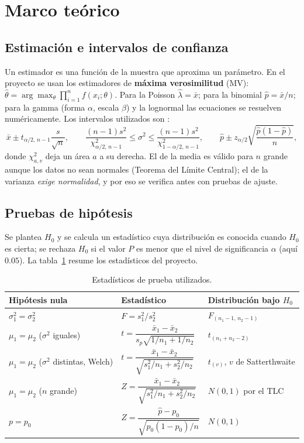 \documentclass[11pt]{article}
\begin{document}
\newpage
\section{Marco teórico}\label{sec:marco}
\subsection{Estimación e intervalos de confianza}
Un estimador es una función de la muestra que aproxima un parámetro. En el proyecto se usan los estimadores de
\textbf{máxima verosimilitud} (MV): $\hat\theta=\arg\max_\theta\prod_{i=1}^n f(x_i;\theta)$. Para la Poisson
$\hat\lambda=\bar x$; para la binomial $\hat p=\bar x/n$; para la gamma (forma $\alpha$, escala $\beta$) y la
lognormal las ecuaciones se resuelven numéricamente. Los intervalos utilizados son \cite{walpole,montgomery}:
\begin{equation}
\bar x\pm t_{\alpha/2,\,n-1}\frac{s}{\sqrt n},\qquad
\frac{(n-1)s^2}{\chi^2_{\alpha/2,\,n-1}}\le\sigma^2\le\frac{(n-1)s^2}{\chi^2_{1-\alpha/2,\,n-1}},\qquad
\hat p\pm z_{\alpha/2}\sqrt{\frac{\hat p(1-\hat p)}{n}},
\label{eq:ic}
\end{equation}
donde $\chi^2_{a,v}$ deja un área $a$ a su derecha. El de la media es válido para $n$ grande aunque los datos no
sean normales (Teorema del Límite Central); el de la varianza \emph{exige normalidad}, y por eso se verifica antes
con pruebas de ajuste.

\subsection{Pruebas de hipótesis}
Se plantea $H_0$ y se calcula un estadístico cuya distribución es conocida cuando $H_0$ es cierta; se rechaza
$H_0$ si el valor $P$ es menor que el nivel de significancia $\alpha$ (aquí $0.05$). La tabla~\ref{tab:pruebas}
resume los estadísticos del proyecto.
\begin{table}[H]\centering\small\caption{Estadísticos de prueba utilizados.}\label{tab:pruebas}
\begin{tabular}{lll}\toprule
\textbf{Hipótesis nula} & \textbf{Estadístico} & \textbf{Distribución bajo $H_0$}\\\midrule
$\sigma_1^2=\sigma_2^2$ & $F=s_1^2/s_2^2$ & $F_{(n_1-1,\,n_2-1)}$\\[2pt]
$\mu_1=\mu_2$ ($\sigma^2$ iguales) & $t=\dfrac{\bar x_1-\bar x_2}{s_p\sqrt{1/n_1+1/n_2}}$ & $t_{(n_1+n_2-2)}$\\[8pt]
$\mu_1=\mu_2$ ($\sigma^2$ distintas, Welch) & $t=\dfrac{\bar x_1-\bar x_2}{\sqrt{s_1^2/n_1+s_2^2/n_2}}$ &
$t_{(v)}$, $v$ de Satterthwaite\\[8pt]
$\mu_1=\mu_2$ ($n$ grande) & $Z=\dfrac{\bar x_1-\bar x_2}{\sqrt{s_1^2/n_1+s_2^2/n_2}}$ & $N(0,1)$ por el TLC\\[8pt]
$p=p_0$ & $Z=\dfrac{\hat p-p_0}{\sqrt{p_0(1-p_0)/n}}$ & $N(0,1)$\\\bottomrule
\end{tabular}\end{table}
\end{document}
